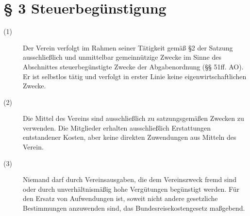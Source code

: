 \documentclass[a4paper,12pt]{scrartcl}
\begin{document}
\section*{\S{} 3 Steuerbegünstigung}
\begin{description} 

\item[(1)] Der Verein verfolgt im Rahmen seiner Tätigkeit gemäß §2 der Satzung ausschließlich und unmittelbar gemeinnützige Zwecke im Sinne des Abschnittes steuerbegünstigte Zwecke der Abgabenordnung (§§ 51ff. AO). Er ist selbstlos tätig und verfolgt in erster Linie keine eigenwirtschaftlichen Zwecke.
\item[(2)] Die Mittel des Vereins sind ausschließlich zu satzungsgemäßen Zwecken zu verwenden. Die Mitglieder erhalten ausschließlich Erstattungen entstandener Kosten, aber keine direkten Zuwendungen aus Mitteln des Verein.
\item[(3)] Niemand darf durch Vereinsausgaben, die dem Vereinszweck fremd sind oder durch unverhältnismäßig hohe Vergütungen begünstigt werden. Für den Ersatz von Aufwendungen ist, soweit nicht andere gesetzliche Bestimmungen anzuwenden sind, das Bundesreisekostengesetz maßgebend.

\end{description}
\end{document}
